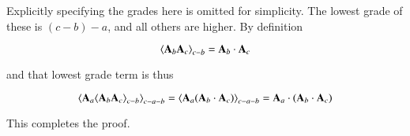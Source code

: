 \documentclass{article}      %
\newcommand{\gpgrade}[2] {{\left\langle{{#1}}\right\rangle}_{#2}}
\begin{document}
Explicitly specifying the grades here is omitted for simplicity.  The lowest grade of these is $(c-b)-a$, and all others are higher.  By definition

\[
\gpgrade{\BA_b \BA_c}{c-b} = \BA_b \cdot \BA_c
\]

and that lowest grade term is thus

\[
\gpgrade{\BA_a \gpgrade{\BA_b \BA_c}{c-b}}{c-a-b}
= \gpgrade{\BA_a (\BA_b \cdot \BA_c)}{c-a-b}
= \BA_a \cdot (\BA_b \cdot \BA_c)
\]

This completes the proof.

\end{document}

